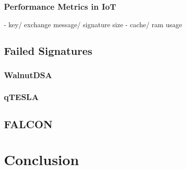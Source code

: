 \documentclass[conference]{IEEEtran}
\begin{document}
\subsubsection{Performance Metrics in IoT}
- key/ exchange message/ signature size 
    - cache/ ram usage

\subsection{Failed Signatures}
\subsubsection{WalnutDSA}
\subsubsection{qTESLA}
\subsection{FALCON}

\section{Conclusion}



\end{document}
